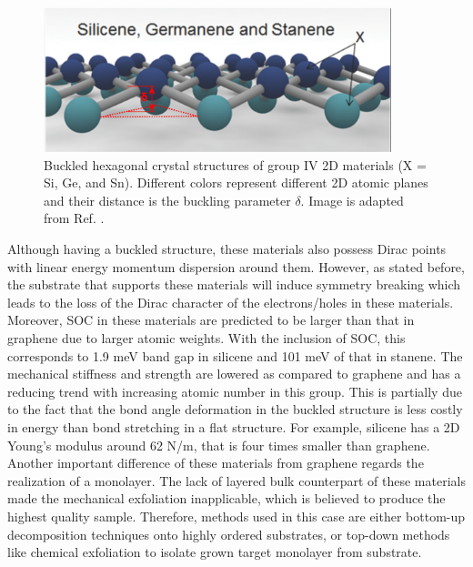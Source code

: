\begin{figure}[htbp!] 
\centering  
\includegraphics[width=0.9\textwidth]{silicene_structure.png}
\caption[Group IV 2D materials]{Buckled hexagonal crystal structures of group IV 2D materials (X = Si, Ge, and Sn). Different colors represent different 2D atomic planes and their distance is the buckling parameter $\delta$. Image is adapted from Ref. \cite{Balendhran2015}.}  
\label{fig:silicene}
\end{figure} 


Although having a buckled structure, these materials also possess Dirac points with linear energy momentum dispersion around them\cite{Garcia2011}.  However, as stated before, the substrate that supports these materials will induce symmetry breaking which leads to the loss of the Dirac character of the electrons/holes\cite{Lin2013} in these materials. Moreover, SOC in these materials are predicted to be larger than that in graphene due to larger atomic weights. With the inclusion of SOC, this corresponds to 1.9 meV band gap in silicene and 101 meV of that in stanene\cite{matthes2013}. The mechanical stiffness and strength are lowered as compared to graphene and has a reducing trend with increasing atomic number in this group. This is partially due to the fact that the bond angle deformation in the buckled structure is less costly in energy than bond stretching in a flat structure\cite{Manjanath2014}. For example, silicene has a 2D Young's modulus around 62 \si{N/m}, that is four times smaller than graphene. Another important difference of these materials from graphene regards the realization of a monolayer. The lack of layered bulk counterpart of these materials made the mechanical exfoliation inapplicable, which is believed to produce the highest quality sample. Therefore, methods used in this case are either bottom-up decomposition techniques onto highly ordered substrates\cite{vogt2012,Linfei2014}, or top-down methods like chemical exfoliation to isolate grown target monolayer from substrate\cite{lin2012,kaloni2013}.


